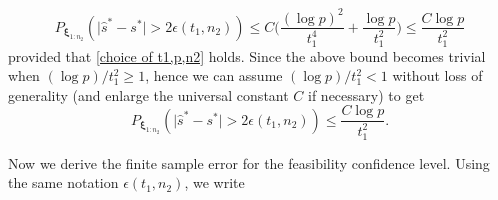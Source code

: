 \documentclass[mnsc,blindrev]{informs4} %
\begin{document}
\begin{equation*}
    P_{\bm{\xi}_{1:n_2}}(\lvert \hat s^*-s^*\rvert> 2\epsilon(t_1,n_2))\leq C\big(\frac{(\log p)^2}{t_1^4}+\frac{\log p}{t_1^2}\big)\leq \frac{C\log p}{t_1^2}
\end{equation*}
provided that \eqref{choice of t1,p,n2} holds. Since the above bound becomes trivial when $(\log p)/t_1^2\geq 1$, hence we can assume $(\log p)/t_1^2< 1$ without loss of generality (and enlarge the universal constant $C$ if necessary) to get
\begin{equation}\label{deviation:parameter}
    P_{\bm{\xi}_{1:n_2}}(\lvert \hat s^*-s^*\rvert> 2\epsilon(t_1,n_2))\leq \frac{C\log p}{t_1^2}.
\end{equation}

Now we derive the finite sample error for the feasibility confidence level. Using the same notation $\epsilon(t_1,n_2)$, we write
\end{document}
